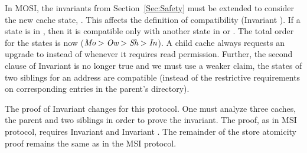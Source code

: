 In MOSI, the invariants from Section~\ref{Sec:Safety} must be extended
to consider the new cache state, \Ow. This affects the definition of
compatibility (Invariant ). If a state is
in \Ow{}, then it is compatible only with another state in \Sh{} or
\In{}. The total order for the states is now ($\textit{Mo} > \textit{Ow} > \textit{Sh} >
\textit{In}$). A child cache always requests an upgrade to \Ow{} instead of
\Sh{} whenever it requires read permission. Further, the second clause
of Invariant  is no longer true and we
must use a weaker claim, \viz the states of two siblings for an
address are compatible (instead of the restrictive requirements on
corresponding entries in the parent's directory).  



The proof of Invariant  changes for this
protocol. One must analyze three caches, the parent and two siblings
in order to prove the invariant. The proof, as in MSI protocol,
requires Invariant  and Invariant
. The remainder of the store atomicity proof remains
the same as in the MSI protocol.
